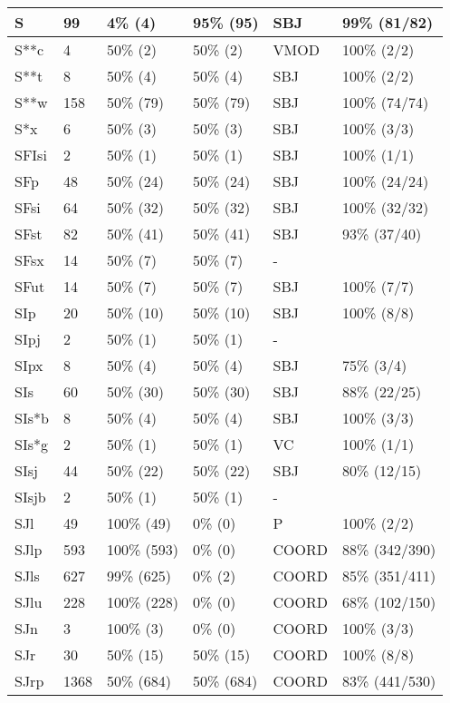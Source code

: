 \begin{figure*}
\begin{tabular}{|l|l|l|l||l|l|}
\hline
 S & 99 & 4\% (4) & 95\% (95) & SBJ & 99\% (81/82) \\ 
\hline
 S**c & 4 & 50\% (2) & 50\% (2) & VMOD & 100\% (2/2) \\ 
\hline
 S**t & 8 & 50\% (4) & 50\% (4) & SBJ & 100\% (2/2) \\ 
\hline
 S**w & 158 & 50\% (79) & 50\% (79) & SBJ & 100\% (74/74) \\ 
\hline
 S*x & 6 & 50\% (3) & 50\% (3) & SBJ & 100\% (3/3) \\ 
\hline
 SFIsi & 2 & 50\% (1) & 50\% (1) & SBJ & 100\% (1/1) \\ 
\hline
 SFp & 48 & 50\% (24) & 50\% (24) & SBJ & 100\% (24/24) \\ 
\hline
 SFsi & 64 & 50\% (32) & 50\% (32) & SBJ & 100\% (32/32) \\ 
\hline
 SFst & 82 & 50\% (41) & 50\% (41) & SBJ & 93\% (37/40) \\ 
\hline
 SFsx & 14 & 50\% (7) & 50\% (7) & - &  \\ 
\hline
 SFut & 14 & 50\% (7) & 50\% (7) & SBJ & 100\% (7/7) \\ 
\hline
 SIp & 20 & 50\% (10) & 50\% (10) & SBJ & 100\% (8/8) \\ 
\hline
 SIpj & 2 & 50\% (1) & 50\% (1) & - &  \\ 
\hline
 SIpx & 8 & 50\% (4) & 50\% (4) & SBJ & 75\% (3/4) \\ 
\hline
 SIs & 60 & 50\% (30) & 50\% (30) & SBJ & 88\% (22/25) \\ 
\hline
 SIs*b & 8 & 50\% (4) & 50\% (4) & SBJ & 100\% (3/3) \\ 
\hline
 SIs*g & 2 & 50\% (1) & 50\% (1) & VC & 100\% (1/1) \\ 
\hline
 SIsj & 44 & 50\% (22) & 50\% (22) & SBJ & 80\% (12/15) \\ 
\hline
 SIsjb & 2 & 50\% (1) & 50\% (1) & - &  \\ 
\hline
 SJl & 49 & 100\% (49) & 0\% (0) & P & 100\% (2/2) \\ 
\hline
 SJlp & 593 & 100\% (593) & 0\% (0) & COORD & 88\% (342/390) \\ 
\hline
 SJls & 627 & 99\% (625) & 0\% (2) & COORD & 85\% (351/411) \\ 
\hline
 SJlu & 228 & 100\% (228) & 0\% (0) & COORD & 68\% (102/150) \\ 
\hline
 SJn & 3 & 100\% (3) & 0\% (0) & COORD & 100\% (3/3) \\ 
\hline
 SJr & 30 & 50\% (15) & 50\% (15) & COORD & 100\% (8/8) \\ 
\hline
 SJrp & 1368 & 50\% (684) & 50\% (684) & COORD & 83\% (441/530) \\ 
\hline
\end{tabular}
\end{figure*}
